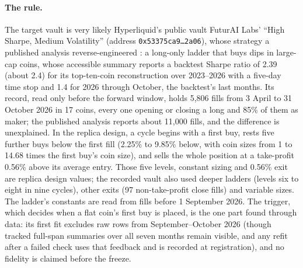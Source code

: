 \documentclass[11pt]{article}
\begin{document}
\paragraph{The rule.} The target vault is very likely Hyperliquid's public vault FuturAI Labs' ``High Sharpe, Medium Volatility'' (address \texttt{0x53375ca9\ldots2a06}), whose strategy a published analysis reverse-engineered \cite{astraeus2026}: a long-only ladder that buys dips in large-cap coins, whose accessible summary reports a backtest Sharpe ratio of 2.39 (about 2.4) for its top-ten-coin reconstruction over 2023--2026 with a five-day time stop and 1.4 for 2026 through October, the backtest's last months. Its record, read only before the forward window, holds 5{,}806 fills from 3 April to 31 October 2026 in 17 coins, every one opening or closing a long and 85\% of them as maker; the published analysis reports about 11{,}000 fills, and the difference is unexplained. In the replica design, a cycle begins with a first buy, rests five further buys below the first fill (2.25\% to 9.85\% below, with coin sizes from 1 to 14.68 times the first buy's coin size), and sells the whole position at a take-profit 0.56\% above its average entry. Those five levels, constant sizing and 0.56\% exit are replica design values; the recorded vault also used deeper ladders (levels six to eight in nine cycles), other exits (97 non-take-profit close fills) and variable sizes. The ladder's constants are read from fills before 1 September 2026. The trigger, which decides when a flat coin's first buy is placed, is the one part found through data: its first fit excludes raw rows from September--October 2026 (though tracked full-span summaries over all seven months remain visible, and any refit after a failed check uses that feedback and is recorded at registration), and no fidelity is claimed before the freeze.
\end{document}
